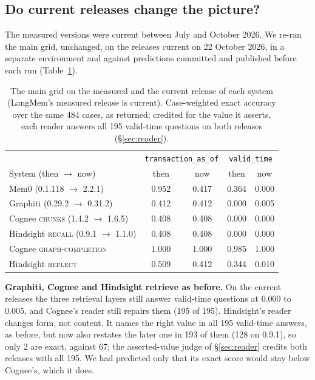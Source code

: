 \documentclass[conference]{IEEEtran}
\begin{document}
\subsection{Do current releases change the picture?}\label{sec:releases}

The measured versions were current between July and October 2026. We re-ran
the main grid, unchanged, on the releases current on 22 October 2026, in a
separate environment and against predictions committed and published before
each run (Table~\ref{tab:releases}).

\begin{table}[t]
\centering
\caption{The main grid on the measured and the current release of each system
(LangMem's measured release is current). Case-weighted exact accuracy over the
same 484 cases, as returned; credited for the value it asserts, each reader
answers all 195 valid-time questions on both releases (\S\ref{sec:reader}).}
\label{tab:releases}
\footnotesize
\setlength{\tabcolsep}{3pt}
\begin{tabular}{@{}lcccc@{}}
\toprule
& \multicolumn{2}{c}{\scriptsize\texttt{transaction\_as\_of}} & \multicolumn{2}{c}{\scriptsize\texttt{valid\_time}} \\
System (then $\to$ now) & then & now & then & now \\
\midrule
Mem0 (0.1.118 $\to$ 2.2.1)               & 0.952 & 0.417 & 0.364 & 0.000 \\
Graphiti (0.29.2 $\to$ 0.31.2)           & 0.412 & 0.412 & 0.000 & 0.005 \\
Cognee \textsc{chunks} (1.4.2 $\to$ 1.6.5) & 0.408 & 0.408 & 0.000 & 0.000 \\
Hindsight \textsc{recall} (0.9.1 $\to$ 1.1.0) & 0.408 & 0.408 & 0.000 & 0.000 \\
\midrule
Cognee \textsc{graph-completion}         & 1.000 & 1.000 & 0.985 & 1.000 \\
Hindsight \textsc{reflect}               & 0.509 & 0.412 & 0.344 & 0.010 \\
\bottomrule
\end{tabular}
\end{table}

\textbf{Graphiti, Cognee and Hindsight retrieve as before.} On the current
releases the three retrieval layers still answer valid-time questions at 0.000
to 0.005, and Cognee's reader still repairs them (195 of 195). Hindsight's
reader changes form, not content. It names the right value in all 195
valid-time answers, as before, but now also restates the later one in 193 of
them (128 on 0.9.1), so only 2 are exact, against 67; the asserted-value judge of
\S\ref{sec:reader} credits both releases with all 195. We had predicted only that
its exact score would stay below Cognee's, which it does.
\end{document}
